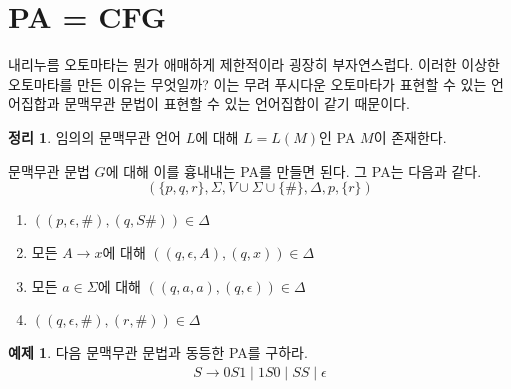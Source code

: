 \documentclass[b5paper, 10pt]{book}
\theoremstyle{definition}
\newtheorem{thm}[defn]{정리}
\newtheorem{ex}[defn]{예제}
\newenvironment{pf*}{\pushQED{\qed}\pf}{\popQED\endpf}
\begin{document}
\section{PA = CFG}
내리누름 오토마타는 뭔가 애매하게 제한적이라 굉장히 부자연스럽다. 이러한 이상한
 오토마타를 만든 이유는 무엇일까?
이는 무려 푸시다운 오토마타가 표현할 수 있는 언어집합과 문맥무관 문법이 표현할 수 
있는 언어집합이 같기 때문이다.
\begin{thm}
임의의 문맥무관 언어 $L$에 대해 $L = L(M)$인 PA $M$이 존재한다.
\end{thm}
\begin{pf*}
문맥무관 문법 $G$에 대해 이를 흉내내는 PA를 만들면 된다. 그 PA는 다음과 같다. 
$$(\{p,q,r\}, \Sigma, V \cup \Sigma \cup \{\#\}, \Delta, p, \{r\})$$
\begin{enumerate}
    \item $((p,\epsilon, \#), (q, S\#)) \in \Delta$
    \item 모든 $A \rightarrow x$에 대해 $((q, \epsilon, A), (q, x)) \in \Delta$
    \item 모든 $a \in \Sigma$에 대해 $((q, a, a) , (q, \epsilon)) \in \Delta$
    \item $((q, \epsilon, \#), (r, \#)) \in \Delta$
\end{enumerate}

\end{pf*}
\begin{ex}
다음 문맥무관 문법과 동등한 PA를 구하라.
\begin{align*}
    S \rightarrow 0S1 \;\vert\; 1S0 \;\vert\; SS \;\vert\; \epsilon
\end{align*}
\begin{figure}[!ht]
    \centering
    \caption{} 
    \label{cfg=pa}
\end{figure}
\end{ex}
\end{document}
